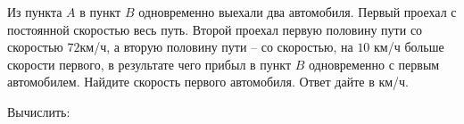 \begin{homework}[number=1]
\begin{listofex}
		\item Из пункта \( A \) в пункт \( B \) одновременно выехали два автомобиля. Первый проехал с постоянной скоростью весь путь. Второй проехал первую половину пути со скоростью \( 72 \)км/ч, а вторую половину пути – со скоростью, на \(10\) км/ч больше скорости первого, в результате чего прибыл в пункт \( B \) одновременно с первым автомобилем. Найдите скорость первого автомобиля. Ответ дайте в км/ч.
		\item Вычислить:
		\begin{enumcols}[itemcolumns=2]
			\item {}
			\item {}
		\end{enumcols}
	\end{listofex}
\end{homework}
